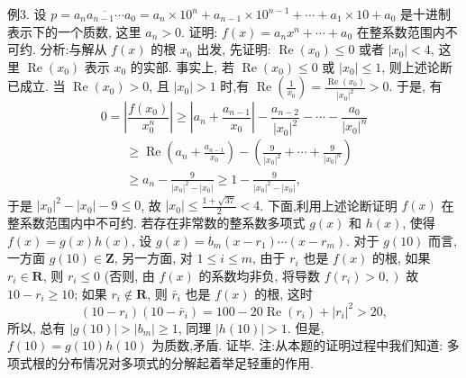 例3. 设 $p=\overline{a_n a_{n-1} \cdots a_0}=a_n \times 10^n+a_{n-1} \times 10^{n-1}+\cdots+a_1 \times 10+a_0$ 是十进制表示下的一个质数, 这里 $a_n>0$. 证明: $f(x)=a_n x^n+\cdots+a_0$ 在整系数范围内不可约.
分析:与解从 $f(x)$ 的根 $x_0$ 出发, 先证明: $\operatorname{Re}\left(x_0\right) \leqslant 0$ 或者 $\left|x_0\right|<4$, 这里 $\operatorname{Re}\left(x_0\right)$ 表示 $x_0$ 的实部.
事实上, 若 $\operatorname{Re}\left(x_0\right) \leqslant 0$ 或 $\left|x_0\right| \leqslant 1$, 则上述论断已成立.
当 $\operatorname{Re}\left(x_0\right)>0$, 且 $\left|x_0\right|>1$ 时,有 $\operatorname{Re}\left(\frac{1}{x_0}\right)=\frac{\operatorname{Re}\left(x_0\right)}{\left|x_0\right|^2}>0$. 于是, 有
$$
0=\left|\frac{f\left(x_0\right)}{x_0^n}\right| \geqslant\left|a_n+\frac{a_{n-1}}{x_0}\right|-\frac{a_{n-2}}{\left|x_0\right|^2}-\cdots-\frac{a_0}{\left|x_0\right|^n}
$$
$$
\begin{aligned}
& \geqslant \operatorname{Re}\left(a_n+\frac{a_{n-1}}{x_0}\right)-\left(\frac{9}{\left|x_0\right|^2}+\cdots+\frac{9}{\left|x_0\right|^n}\right) \\
& \geqslant a_n-\frac{9}{\left|x_0\right|^2-\left|x_0\right|} \geqslant 1-\frac{9}{\left|x_0\right|^2-\left|x_0\right|},
\end{aligned}
$$
于是 $\left|x_0\right|^2-\left|x_0\right|-9 \leqslant 0$, 故 $\left|x_0\right| \leqslant \frac{1+\sqrt{37}}{2}<4$.
下面,利用上述论断证明 $f(x)$ 在整系数范围内中不可约.
若存在非常数的整系数多项式 $g(x)$ 和 $h(x)$, 使得 $f(x)=g(x) h(x)$, 设 $g(x)=b_m\left(x-r_1\right) \cdots\left(x-r_m\right)$. 对于 $g(10)$ 而言,一方面 $g(10) \in \mathbf{Z}$, 另一方面, 对 $1 \leqslant i \leqslant m$, 由于 $r_i$ 也是 $f(x)$ 的根, 如果 $r_i \in \mathbf{R}$, 则 $r_i \leqslant 0$ (否则, 由 $f(x)$ 的系数均非负, 将导数 $\left.f\left(r_i\right)>0,\right)$ 故 $10-r_i \geqslant 10$; 如果 $r_i \notin \mathbf{R}$, 则 $\bar{r}_i$ 也是 $f(x)$ 的根, 这时
$$
\left(10-r_i\right)\left(10-\bar{r}_i\right)=100-20 \operatorname{Re}\left(r_i\right)+\left|r_i\right|^2>20,
$$
所以, 总有 $|g(10)|>\left|b_m\right| \geqslant 1$, 同理 $|h(10)|>1$.
但是, $f(10)=g(10) h(10)$ 为质数,矛盾.
证毕.
注:从本题的证明过程中我们知道: 多项式根的分布情况对多项式的分解起着举足轻重的作用.



